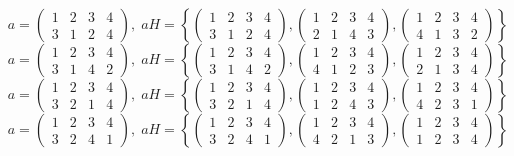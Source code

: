 \documentclass[a4paper,12pt]{article}
\begin{document}
\begin{itemize}
\[a = \begin{pmatrix} 1 & 2 & 3 & 4 \\ 3&1&2&4\end{pmatrix}, \; aH = \left\{\begin{pmatrix} 1 & 2 & 3 & 4 \\ 3&1&2&4\end{pmatrix}, \begin{pmatrix} 1 & 2 & 3 & 4 \\ 2&1&4&3\end{pmatrix}, \begin{pmatrix} 1 & 2 & 3 & 4 \\ 4&1&3&2\end{pmatrix} \right\}\]
\[a = \begin{pmatrix} 1 & 2 & 3 & 4 \\ 3&1&4&2\end{pmatrix}, \; aH = \left\{\begin{pmatrix} 1 & 2 & 3 & 4 \\ 3&1&4&2\end{pmatrix}, \begin{pmatrix} 1 & 2 & 3 & 4 \\ 4&1&2&3\end{pmatrix}, \begin{pmatrix} 1 & 2 & 3 & 4 \\ 2&1&3&4\end{pmatrix} \right\}\]
\[a = \begin{pmatrix} 1 & 2 & 3 & 4 \\ 3&2&1&4\end{pmatrix}, \; aH = \left\{\begin{pmatrix} 1 & 2 & 3 & 4 \\ 3&2&1&4\end{pmatrix}, \begin{pmatrix} 1 & 2 & 3 & 4 \\ 1&2&4&3\end{pmatrix}, \begin{pmatrix} 1 & 2 & 3 & 4 \\ 4&2&3&1\end{pmatrix} \right\}\]
\[a = \begin{pmatrix} 1 & 2 & 3 & 4 \\ 3&2&4&1\end{pmatrix}, \; aH = \left\{\begin{pmatrix} 1 & 2 & 3 & 4 \\ 3&2&4&1\end{pmatrix}, \begin{pmatrix} 1 & 2 & 3 & 4 \\ 4&2&1&3\end{pmatrix}, \begin{pmatrix} 1 & 2 & 3 & 4 \\ 1&2&3&4\end{pmatrix} \right\}\]

\end{itemize}
\end{document}
